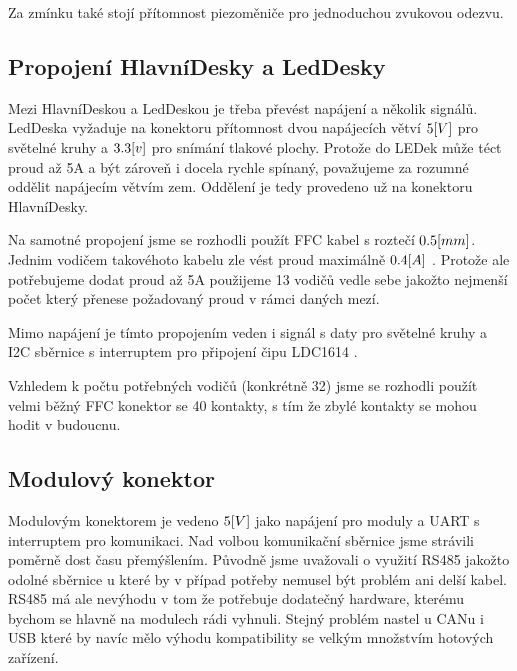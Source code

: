 Za zmínku také stojí přítomnost piezoměniče pro jednoduchou zvukovou odezvu. 

\subsection{Propojení HlavníDesky a LedDesky}
Mezi HlavníDeskou a LedDeskou je třeba převést napájení a několik signálů.
LedDeska vyžaduje na konektoru přítomnost dvou napájecích větví \(5\-[V]\) pro světelné kruhy a \(3.3\-[v]\) pro snímání tlakové plochy.
Protože do LEDek může téct proud až 5A a být zároveň i docela rychle spínaný, považujeme za rozumné oddělit napájecím větvím zem.
Oddělení je tedy provedeno už na konektoru HlavníDesky.

Na samotné propojení jsme se rozhodli použít FFC kabel s roztečí \(0.5\-[mm]\).
Jednim vodičem takovéhoto kabelu zle vést proud maximálně \(0.4\-[A]\) \cite{FFC-konektor}.
Protože ale potřebujeme dodat proud až 5A použijeme 13 vodičů vedle sebe jakožto nejmenší počet který přenese požadovaný proud v rámci daných mezí.

Mimo napájení je tímto propojením veden i signál s daty pro světelné kruhy a I2C sběrnice s interruptem pro připojení čipu LDC1614 \cite{LDC1614}.

Vzhledem k počtu potřebných vodičů (konkrétně 32) jsme se rozhodli použít velmi běžný FFC konektor se 40 kontakty, s tím že zbylé kontakty se mohou hodit v budoucnu.

\subsection{Modulový konektor}
Modulovým konektorem je vedeno \(5\-[V]\) jako napájení pro moduly a UART s interruptem pro komunikaci.
Nad volbou komunikační sběrnice jsme strávili poměrně dost času přemýšlením.
Původně jsme uvažovali o využití RS485 jakožto odolné sběrnice u které by v případ potřeby nemusel být problém ani delší kabel.
RS485 má ale nevýhodu v tom že potřebuje dodatečný hardware, kterému bychom se hlavně na modulech rádi vyhnuli.
Stejný problém nastel u CANu i USB které by navíc mělo výhodu kompatibility se velkým množstvím hotových zařízení.


